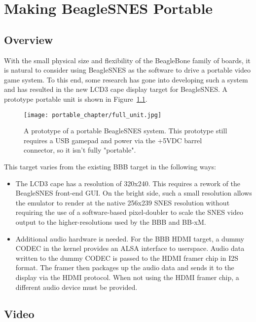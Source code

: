 \chapter{Making BeagleSNES Portable}

\section{Overview}

With the small physical size and flexibility of the BeagleBone family of boards, it is natural to consider using BeagleSNES as the software to drive a portable video game system.  To this end, some research has gone into developing such a system and has resulted in the new LCD3 cape display target for BeagleSNES. A prototype portable unit is shown in Figure~\ref{fig:full_unit}.
 
\begin{figure}[h]
\centering\texttt{[image: portable\_chapter/full\_unit.jpg]} 
\caption{A prototype of a portable BeagleSNES system. This prototype still requires a USB gamepad and power via the +5VDC barrel connector, so it isn't fully "portable".}\label{fig:full_unit}
\end{figure}

This target varies from the existing BBB target in the following ways:
\begin{itemize}
\item The LCD3 cape has a resolution of 320x240.  This requires a rework of the BeagleSNES front-end GUI.  On the bright side, such a small resolution allows the emulator to render at the native 256x239 SNES resolution without requiring the use of a software-based pixel-doubler to scale the SNES video output to the higher-resolutions used by the BBB and BB-xM.
\item Additional audio hardware is needed.  For the BBB HDMI target, a dummy CODEC in the kernel provides an ALSA interface to userspace.  Audio data written to the dummy CODEC is passed to the HDMI framer chip in I2S format.  The framer then packages up the audio data and sends it to the display via the HDMI protocol.  When not using the HDMI framer chip, a different audio device must be provided.
\end{itemize}

\section{Video}

